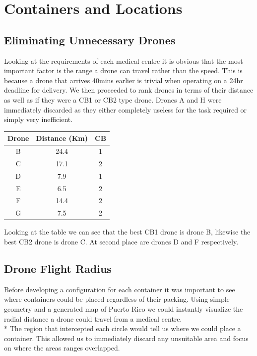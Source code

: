 \documentclass[a4paper,12pt]{article}
\begin{document}
\section{Containers and Locations}
\subsection{Eliminating Unnecessary Drones}
Looking at the requirements of each medical centre it is obvious that the most important factor is the range a drone can travel rather than the speed.
This is because a drone that arrives 40mins earlier is trivial when operating on a 24hr deadline for delivery.
We then proceeded to rank drones in terms of their distance as well as if they were a CB1 or CB2 type drone.
Drones A and H were immediately discarded as they either completely useless for the task required or simply very inefficient.

\begin{center}
\begin{tabular}{ |c|c|c| }
 \hline
 Drone & Distance (Km) & CB \\\hline
  B & 24.4 & 1 \\
  C & 17.1 & 2  \\
  D & 7.9 & 1 \\
  E & 6.5 & 2 \\
  F & 14.4 & 2 \\
  G & 7.5 & 2 \\
 \hline
\end{tabular}
\end{center}
Looking at the table we can see that the best CB1 drone is drone B, likewise the best CB2 drone is drone C. At second place are drones D and F respectively.

\subsection{Drone Flight Radius}
Before developing a configuration for each container it was important to see where containers could be placed regardless of their packing.
Using simple geometry and a generated map of Puerto Rico we could instantly visualize the radial distance a drone could travel from a medical centre.\\*
The region that intercepted each circle would tell us where we could place a container. This allowed us to immediately discard any unsuitable area and focus on where the areas ranges overlapped.
\end{document}
